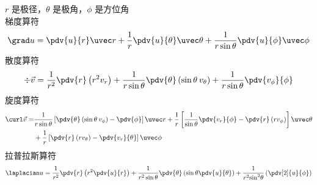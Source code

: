 
$r$ 是极径，$\theta $ 是极角，$\phi $ 是方位角\\
 梯度算符
\begin{equation}
\grad u = \pdv{u}{r}\uvec r + \frac{1}{r} \pdv{u}{\theta}\uvec \theta  + \frac{1}{{r\sin \theta }}\pdv{u}{\phi}\uvec \phi
\end{equation}
 散度算符 
\begin{equation}
\div \vec v = \frac{1}{{{r^2}}} \pdv{r} \left( {{r^2}{v_r}} \right) + \frac{1}{{r\sin \theta }} \pdv{\theta} \left( {\sin \theta {\kern 1pt} {\kern 1pt} {v_\theta }} \right) + \frac{1}{{r\sin \theta }}\pdv{v_\phi}{\phi}
\end{equation}
 旋度算符
\begin{equation}
\begin{aligned}
\curl \vec v = & \frac{1}{{r\sin \theta }}\left[ {\pdv{\theta} \left( {\sin \theta {\kern 1pt} {\kern 1pt} {v_\phi }} \right) - \pdv{\phi}} \right]\uvec r  + \frac{1}{r}\left[ {\frac{1}{{\sin \theta }}\pdv{v_r}{\phi} - \pdv{r} \left( {r{v_\phi }} \right)} \right]\uvec \theta   \\
&+ \frac{1}{r}\left[ {\pdv{r} \left( {r{v_\theta }} \right) - \pdv{v_r}{\theta}} \right]\uvec \phi
\end{aligned}
\end{equation}
拉普拉斯算符
\begin{equation}
{\laplacian}u = \frac{1}{{{r^2}}}\pdv{r} \left( {{r^2} \pdv{u}{r}} \right) + \frac{1}{{{r^2}\sin \theta }} \pdv{\theta} \left( {\sin \theta \pdv{u}{\theta}} \right) + \frac{1}{{{r^2}{{\sin }^2}\theta }}\left( {\pdv[2]{u}{\phi}} \right)
\end{equation}
 